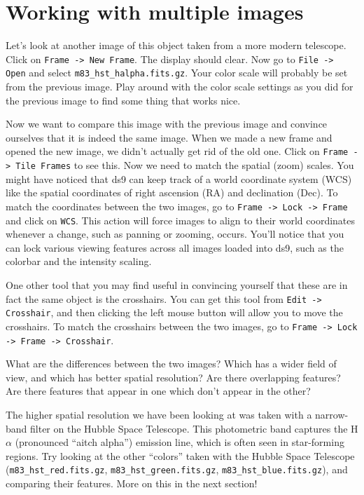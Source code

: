 \documentclass[12pt]{article}
\begin{document}
\section{Working with multiple images}
\label{sec:multiple}

Let's look at another image of this object taken from a more modern telescope.  Click on \texttt{Frame -> New Frame}.  The display should clear.  Now go to \texttt{File -> Open} and select \texttt{m83\_hst\_halpha.fits.gz}.  Your color scale will probably be set from the previous image.  Play around with the color scale settings as you did for the previous image to find some thing that works nice.

Now we want to compare this image with the previous image and convince ourselves that it is indeed the same image.  When we made a new frame and opened the new image, we didn't actually get rid of the old one.  Click on \texttt{Frame -> Tile Frames} to see this.  Now we need to match the spatial (zoom) scales.  You might have noticed that ds9 can keep track of a world coordinate system (WCS) like the spatial coordinates of right ascension (RA) and declination (Dec).  To match the coordinates between the two images, go to \texttt{Frame -> Lock -> Frame} and click on \texttt{WCS}.  This action will force images to align to their world coordinates whenever a change, such as panning or zooming, occurs.  You'll notice that you can lock various viewing features across all images loaded into ds9, such as the colorbar and the intensity scaling.

One other tool that you may find useful in convincing yourself that these are in fact the same object is the crosshairs.  You can get this tool from \texttt{Edit -> Crosshair}, and then clicking the left mouse button will allow you to move the crosshairs.  To match the crosshairs between the two images, go to \texttt{Frame -> Lock -> Frame -> Crosshair}.

What are the differences between the two images?  Which has a wider field of view, and which has better spatial resolution?  Are there overlapping features?  Are there features that appear in one which don't appear in the other? 

The higher spatial resolution we have been looking at was taken with a narrow-band filter on the Hubble Space Telescope.  This photometric band captures the H$\alpha$ (pronounced ``aitch alpha'') emission line, which is often seen in star-forming regions.  Try looking at the other ``colors'' taken with the Hubble Space Telescope (\texttt{m83\_hst\_red.fits.gz}, \texttt{m83\_hst\_green.fits.gz}, \texttt{m83\_hst\_blue.fits.gz}), and comparing their features.  More on this in the next section!
\end{document}
